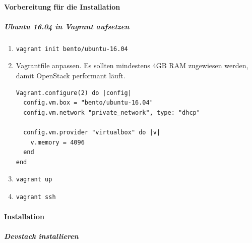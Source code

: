 \documentclass[a4paper,10pt]{article}
\begin{document}

\paragraph{Vorbereitung für die Installation}

\subparagraph{Ubuntu 16.04 in Vagrant aufsetzen}

\begin{enumerate}
 \item \begin{verbatim}vagrant init bento/ubuntu-16.04\end{verbatim}
 \item Vagrantfile anpassen. Es sollten mindestens 4GB RAM zugewiesen werden, damit OpenStack performant läuft.\\
\begin{minipage}{\textwidth}
\begin{lstlisting}[frame=single,caption=Installation Ubuntu 16.04 in Vagrant]
Vagrant.configure(2) do |config|
  config.vm.box = "bento/ubuntu-16.04"
  config.vm.network "private_network", type: "dhcp"
 
  config.vm.provider "virtualbox" do |v|
    v.memory = 4096
  end
end
\end{lstlisting}
\end{minipage}
 \item \begin{verbatim}vagrant up\end{verbatim}
 \item \begin{verbatim}vagrant ssh\end{verbatim}
\end{enumerate}
 
\paragraph{Installation}
 
\subparagraph{Devstack installieren}
  
\end{document}
